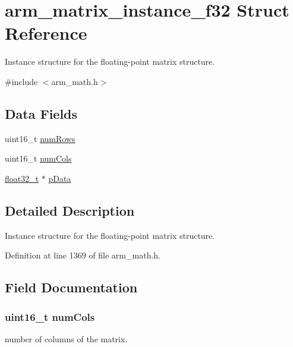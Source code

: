 \hypertarget{structarm__matrix__instance__f32}{}\section{arm\+\_\+matrix\+\_\+instance\+\_\+f32 Struct Reference}
\label{structarm__matrix__instance__f32}


Instance structure for the floating-\/point matrix structure.  




{\ttfamily \#include $<$arm\+\_\+math.\+h$>$}

\subsection*{Data Fields}
\begin{DoxyCompactItemize}
\item 
uint16\+\_\+t \hyperlink{structarm__matrix__instance__f32_a1bcf80ccdc2acc29198f1592ae300390}{num\+Rows}
\item 
uint16\+\_\+t \hyperlink{structarm__matrix__instance__f32_a4bb5ec0d13eb4c9cf887aa8366a44117}{num\+Cols}
\item 
\hyperlink{arm__math_8h_a4611b605e45ab401f02cab15c5e38715}{float32\+\_\+t} $\ast$ \hyperlink{structarm__matrix__instance__f32_af5c3a2f15c98850cdcfbe6f87e5ac5df}{p\+Data}
\end{DoxyCompactItemize}


\subsection{Detailed Description}
Instance structure for the floating-\/point matrix structure. 

Definition at line 1369 of file arm\+\_\+math.\+h.



\subsection{Field Documentation}
\subsubsection[{\texorpdfstring{num\+Cols}{numCols}}]{\setlength{\rightskip}{0pt plus 5cm}uint16\+\_\+t num\+Cols}\hypertarget{structarm__matrix__instance__f32_a4bb5ec0d13eb4c9cf887aa8366a44117}{}\label{structarm__matrix__instance__f32_a4bb5ec0d13eb4c9cf887aa8366a44117}
number of columns of the matrix. 

